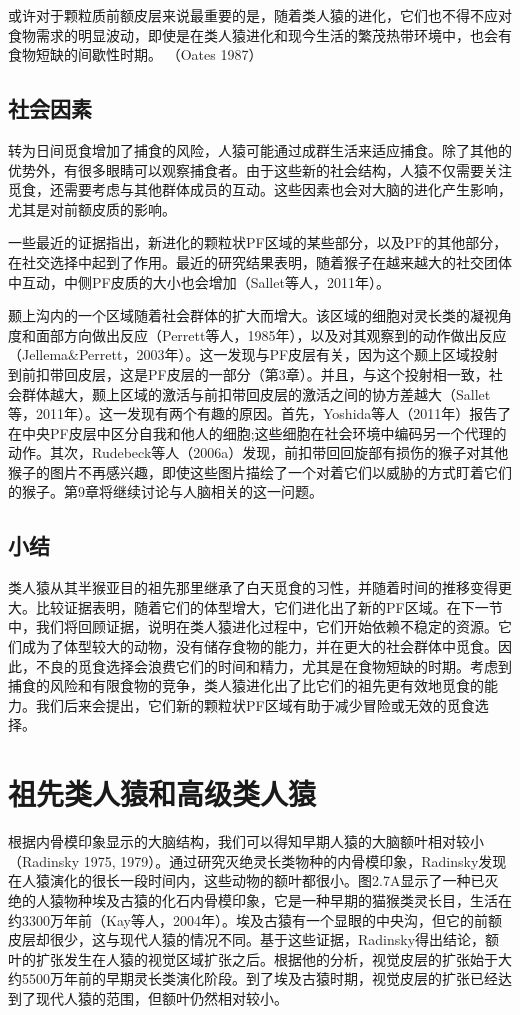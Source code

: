 或许对于颗粒质前额皮层来说最重要的是，随着类人猿的进化，它们也不得不应对食物需求的明显波动，即使是在类人猿进化和现今生活的繁茂热带环境中，也会有食物短缺的间歇性时期。 （Oates 1987）

\subsection{社会因素}
转为日间觅食增加了捕食的风险，人猿可能通过成群生活来适应捕食。除了其他的优势外，有很多眼睛可以观察捕食者。由于这些新的社会结构，人猿不仅需要关注觅食，还需要考虑与其他群体成员的互动。这些因素也会对大脑的进化产生影响，尤其是对前额皮质的影响。

一些最近的证据指出，新进化的颗粒状PF区域的某些部分，以及PF的其他部分，在社交选择中起到了作用。最近的研究结果表明，随着猴子在越来越大的社交团体中互动，中侧PF皮质的大小也会增加（Sallet等人，2011年）。

颞上沟内的一个区域随着社会群体的扩大而增大。该区域的细胞对灵长类的凝视角度和面部方向做出反应（Perrett等人，1985年），以及对其观察到的动作做出反应（Jellema\&Perrett，2003年）。这一发现与PF皮层有关，因为这个颞上区域投射到前扣带回皮层，这是PF皮层的一部分（第3章）。并且，与这个投射相一致，社会群体越大，颞上区域的激活与前扣带回皮层的激活之间的协方差越大（Sallet等，2011年）。这一发现有两个有趣的原因。首先，Yoshida等人（2011年）报告了在中央PF皮层中区分自我和他人的细胞;这些细胞在社会环境中编码另一个代理的动作。其次，Rudebeck等人（2006a）发现，前扣带回回旋部有损伤的猴子对其他猴子的图片不再感兴趣，即使这些图片描绘了一个对着它们以威胁的方式盯着它们的猴子。第9章将继续讨论与人脑相关的这一问题。

\subsection{小结}
类人猿从其半猴亚目的祖先那里继承了白天觅食的习性，并随着时间的推移变得更大。比较证据表明，随着它们的体型增大，它们进化出了新的PF区域。在下一节中，我们将回顾证据，说明在类人猿进化过程中，它们开始依赖不稳定的资源。它们成为了体型较大的动物，没有储存食物的能力，并在更大的社会群体中觅食。因此，不良的觅食选择会浪费它们的时间和精力，尤其是在食物短缺的时期。考虑到捕食的风险和有限食物的竞争，类人猿进化出了比它们的祖先更有效地觅食的能力。我们后来会提出，它们新的颗粒状PF区域有助于减少冒险或无效的觅食选择。

\section{祖先类人猿和高级类人猿}
根据内骨模印象显示的大脑结构，我们可以得知早期人猿的大脑额叶相对较小（Radinsky 1975, 1979）。通过研究灭绝灵长类物种的内骨模印象，Radinsky发现在人猿演化的很长一段时间内，这些动物的额叶都很小。图2.7A显示了一种已灭绝的人猿物种埃及古猿的化石内骨模印象，它是一种早期的猫猴类灵长目，生活在约3300万年前（Kay等人，2004年）。埃及古猿有一个显眼的中央沟，但它的前额皮层却很少，这与现代人猿的情况不同。基于这些证据，Radinsky得出结论，额叶的扩张发生在人猿的视觉区域扩张之后。根据他的分析，视觉皮层的扩张始于大约5500万年前的早期灵长类演化阶段。到了埃及古猿时期，视觉皮层的扩张已经达到了现代人猿的范围，但额叶仍然相对较小。

